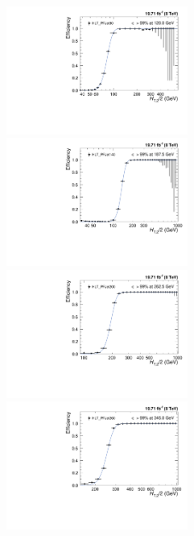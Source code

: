 \begin{figure}[!htbp]
 \begin{center}
 \hspace*{-10mm}\includegraphics[width=0.53\textwidth]{Plots_HT_2_150/Fit_Turn_Efficiency_80_2_ht_2.pdf}%
 ~~\includegraphics[width=0.53\textwidth]{Plots_HT_2_150/Fit_Turn_Efficiency_140_2_ht_2.pdf}\\
 \vspace*{6mm}
 \hspace*{-10mm}\includegraphics[width=0.53\textwidth]{Plots_HT_2_150/Fit_Turn_Efficiency_200_2_ht_2.pdf}%
 ~~\includegraphics[width=0.53\textwidth]{Plots_HT_2_150/Fit_Turn_Efficiency_260_2_ht_2.pdf}\\

\end{center}
\end{figure}
